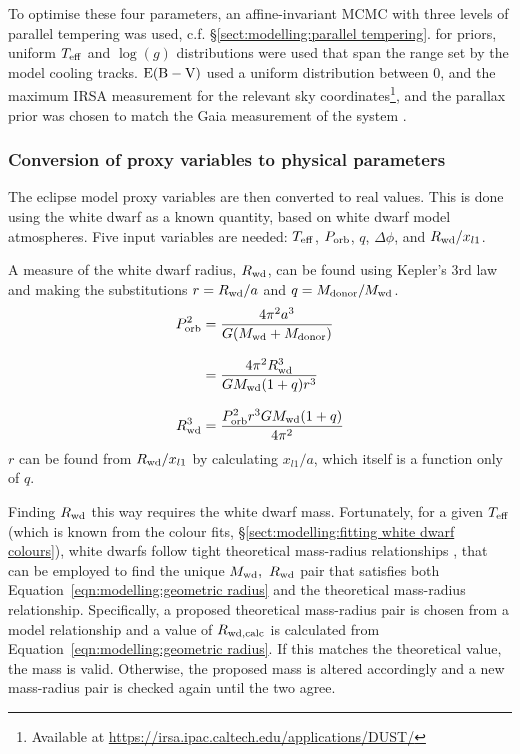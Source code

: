 To optimise these four parameters, an affine-invariant MCMC with three levels of parallel tempering was used, c.f. \S\ref{sect:modelling:parallel tempering}. for priors, uniform $T_{\rm eff}$ and $\log (g)$ distributions were used that span the range set by the model cooling tracks. ${\rm E(B-V)}$ used a uniform distribution between 0, and the maximum IRSA measurement for the relevant sky coordinates\footnote{Available at \href{https://irsa.ipac.caltech.edu/applications/DUST/}{https://irsa.ipac.caltech.edu/applications/DUST/}}, and the parallax prior was chosen to match the Gaia measurement of the system \citep{lindegren2018, Luri2018, Gaia2016, Gaia2018}.

\subsubsection{Conversion of proxy variables to physical parameters}
\label{sect:modelling:conversion to physical parameters}
The eclipse model proxy variables are then converted to real values. This is done using the white dwarf as a known quantity, based on white dwarf model atmospheres. Five input variables are needed: $T_{\rm eff}$, $P_{\rm orb}$, $q$, $\Delta \phi$, and $R_{\rm wd} / x_{l1}$.


A measure of the white dwarf radius, $R_{\rm wd}$, can be found using Kepler's 3rd law and making the substitutions $r = R_{\rm wd} / a$ and $q = M_{\rm donor} / M_{\rm wd}$.
\begin{align}
    P_{\rm orb}^2 &= \frac{4 \pi^2 a^3}{G (M_{\rm wd} + M_{\rm donor})} \\[8pt]
    &= \frac{4 \pi^2 R_{\rm wd}^3}{G M_{\rm wd} (1 + q) r^3} \\[8pt]
    R_{\rm wd}^3 &= \frac{P_{\rm orb}^2 r^3 G M_{\rm wd} (1 + q) }{4 \pi^2}
    \label{eqn:modelling:geometric radius}
\end{align}
$r$ can be found from $R_{\rm wd} / x_{l1}$ by calculating $x_{l1} / a$, which itself is a function only of $q$.

Finding $R_{\rm wd}$ this way requires the white dwarf mass. Fortunately, for a given $T_{\rm eff}$ (which is known from the colour fits, \S\ref{sect:modelling:fitting white dwarf colours}), white dwarfs follow tight theoretical mass-radius relationships \citep{parsons2017}, that can be employed to find the unique $M_{\rm wd},\ R_{\rm wd}$ pair that satisfies both Equation~\ref{eqn:modelling:geometric radius} and the theoretical mass-radius relationship.
Specifically, a proposed theoretical mass-radius pair is chosen from a model relationship and a value of $R_{\rm wd, calc}$ is calculated from Equation~\ref{eqn:modelling:geometric radius}. If this matches the theoretical value, the mass is valid. Otherwise, the proposed mass is altered accordingly and a new mass-radius pair is checked again until the two agree.

